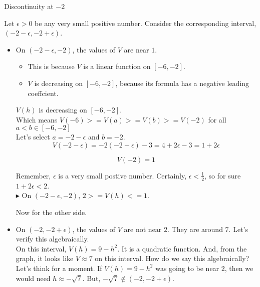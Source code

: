 \documentclass{ximera}
\begin{document}
\begin{explanation} Discontinuity at $-2$


Let $\epsilon > 0$ be any very small positive number.  Consider the corresponding interval, $(-2 - \epsilon, -2 + \epsilon)$.

\begin{itemize}
\item On $(-2 - \epsilon, -2)$, the values of $V$ are near $1$. \\

\begin{itemize}
  \item This is because $V$ is a linear function on $[-6, -2]$.
  \item $V$ is decreasing on $[-6, -2]$, because its formula has a negative leading coeffcient.
\end{itemize}

$V(h)$ is decreasing on $[-6, -2]$. \\
Which means $V(-6) >= V(a) >= V(b) >= V(-2)$ for all $a < b \in [-6, -2]$ \\

Let's select $a = -2 - \epsilon$ and $b = -2$. \\

\[
V(-2 - \epsilon) = -2 (-2 - \epsilon) - 3 = 4 + 2 \epsilon - 3 = 1 + 2 \epsilon 
\]

\[
V(-2) = 1
\]


Remember, $\epsilon$ is a very small postive number.  Certainly, $\epsilon < \frac{1}{2}$, so for sure $1 + 2 \epsilon < 2$. \\


\textbf{\textcolor{blue!55!black}{$\blacktriangleright$}} On $(-2 - \epsilon, -2)$, $2 >= V(h) <= 1$.

Now for the other side. \\



\item On $(-2, -2 + \epsilon)$, the values of $V$ are not near $2$.  They are around $7$. Let's verify this algebraically. \\



On this interval, $V(h) = 9 - h^2$. It is a quadratic function.  And, from the graph, it looks like $V \approx 7$ on this interval. How do we say this algebraically?  \\


Let's think for a moment.  If $V(h) = 9 - h^2$ was going to be near $2$, then we would need $h \approx -\sqrt{7}$.  But, $-\sqrt{7} \notin (-2, -2 + \epsilon)$.  \\


\end{itemize}
\end{explanation}
\end{document}
